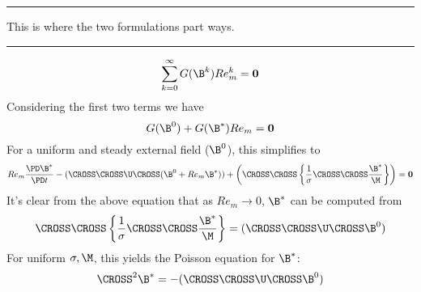 \documentclass[11pt]{article}
\begin{document}
\noindent
\rule{\textwidth}{1pt}
\begin{center}
This is where the two formulations part ways.
\end{center}
\noindent
\rule{\textwidth}{1pt}
\begin{equation}
	\sum_{k=0}^{\infty} G(\B^k)
  Re_m^k
	=
	\mathbf{0}
\end{equation}
Considering the first two terms we have
\begin{equation}
  G(\B^0)
  +
  G(\B^{*}) Re_m
  =
  \mathbf{0}
\end{equation}
For a uniform and steady external field ($\B^0$), this simplifies to
\begin{equation}
  Re_m \frac{\PD \B^{*}}{\PD t}
  -
  (\CROSS \CROSS \U \CROSS (\B^0 + Re_m \B^*))
  +
  \left(
  \CROSS \CROSS
  \left\{
  \frac{1}{\sigma}
  \CROSS \CROSS
  \frac{\B^{*}}{\M}
  \right\}
  \right)
  =
  \mathbf{0}
\end{equation}
It's clear from the above equation that as $Re_m \rightarrow 0$, $\B^*$ can be computed from
\begin{equation}
  \CROSS \CROSS
  \left\{
  \frac{1}{\sigma}
  \CROSS \CROSS
  \frac{\B^{*}}{\M}
  \right\}
  =
  (\CROSS \CROSS \U \CROSS \B^0)
\end{equation}
For uniform $\sigma, \M$, this yields the Poisson equation for $\B^*$:
\begin{equation}
  \CROSS^2 \B^{*}
  =
  -
  (\CROSS \CROSS \U \CROSS \B^0)
\end{equation}
\end{document}
